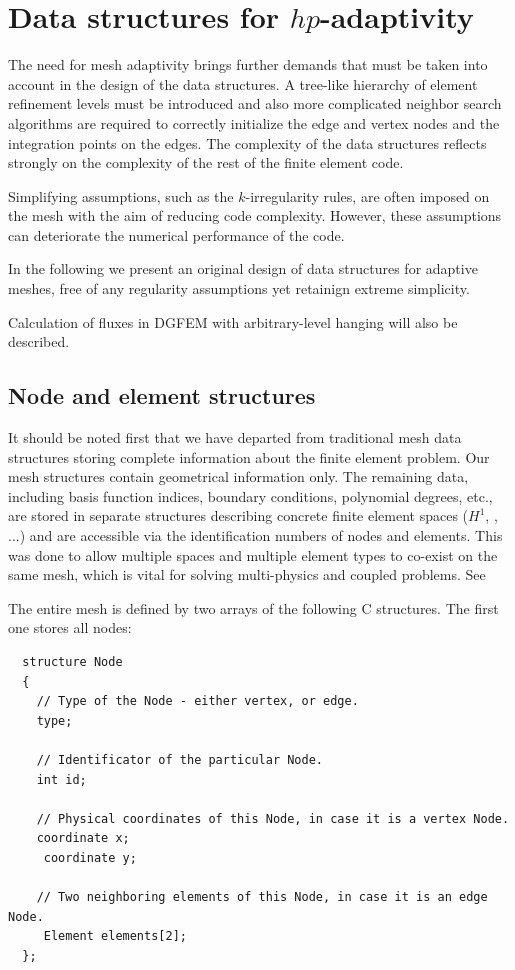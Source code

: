 \section{Data structures for $hp$-adaptivity}
\label{sec:data_structures}
The need for mesh adaptivity brings further demands that must be
taken into account in the design of the data structures. A tree-like
hierarchy of element refinement levels must be introduced and also
more complicated neighbor search algorithms are required to correctly
initialize the edge and vertex nodes and the integration points on the edges. The complexity of the data
structures reflects strongly on the complexity of the rest of the
finite element code. 

Simplifying assumptions, such as the
$k$-irregularity rules, are often imposed on the mesh with the aim of reducing code complexity.
However, these assumptions can deteriorate the numerical performance of the code.

In the following we present an original design of data structures for
adaptive meshes, free of any regularity assumptions yet retainign
extreme simplicity.

Calculation of fluxes in DGFEM with arbitrary-level hanging will also be described.

\subsection{Node and element structures}

It should be noted first that we have departed from traditional mesh
data structures storing complete information about the finite element
problem. Our mesh structures contain geometrical information only. The remaining data, including basis function indices, boundary conditions,
polynomial degrees, etc., are stored in separate structures describing
concrete finite element spaces ($H^1$, \Hcurl, ...) and are accessible
via the identification numbers of nodes and elements. This was done to allow
multiple spaces and multiple element types to co-exist on the same mesh,
which is vital for solving multi-physics and coupled problems. See~\cite{my presentation somewhere on my web or what not}

The entire mesh is defined by two arrays of the following C structures.
The first one stores all nodes:
\begin{lstlisting}
  structure Node
  {
    // Type of the Node - either vertex, or edge.
    type;

    // Identificator of the particular Node.
    int id;

    // Physical coordinates of this Node, in case it is a vertex Node.
    coordinate x;
	 coordinate y;

    // Two neighboring elements of this Node, in case it is an edge Node.
	 Element elements[2];
  };
\end{lstlisting}

